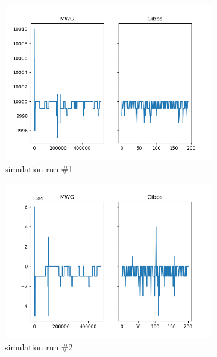 \begin{figure}[H]
    \centering
    \begin{subfigure}{.3\textwidth}
    	\centering
        \includegraphics[width=\linewidth]{../../plots/Trace_post_burnin_M2_N20000_NMCMC3_seed0_diffind2.png}
        \caption{simulation run \#1}
    \end{subfigure}
    \begin{subfigure}{.3\textwidth}
        \centering
    	\includegraphics[width=\linewidth]{../../plots/Trace_post_burnin_M2_N20000_NMCMC3_seed1_diffind2.png}
    	\caption{simulation run \#2}
	\end{subfigure}
	\begin{subfigure}{.3\textwidth}

\end{subfigure}
\end{figure}
